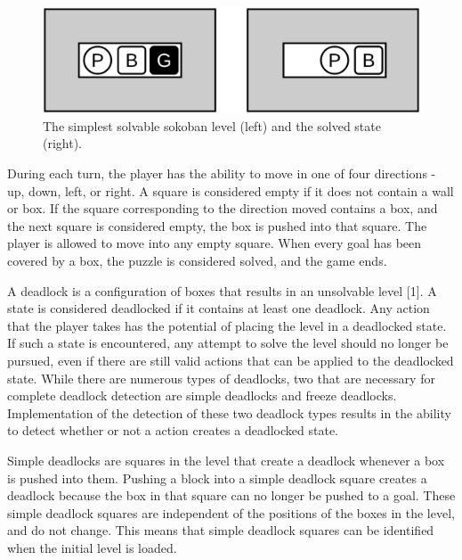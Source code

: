 \documentclass[times, 10pt,twocolumn]{article}
\begin{document}
\begin{figure}[h] 
  \centering
     \includegraphics[width=0.7\linewidth]{basic_unsolved_solved.png}
  \caption{The simplest solvable sokoban level (left) and the solved state (right).}
  \label{fig:b}
\end{figure}


During each turn, the player has the ability to move in one of four directions - up, down, left, or right. A square is considered empty if it does not contain a wall or box. If the square corresponding to the direction moved contains a box, and the next square is considered empty, the box is pushed into that square. The player is allowed to move into any empty square. When every goal has been covered by a box, the puzzle is considered solved, and the game ends.


A deadlock is a configuration of boxes that results in an unsolvable level [1]. A state is considered deadlocked if it contains at least one deadlock. Any action that the player takes has the potential of placing the level in a deadlocked state. If such a state is encountered, any attempt to solve the level should no longer be pursued, even if there are still valid actions that can be applied to the deadlocked state. While there are numerous types of deadlocks, two that are necessary for complete deadlock detection are simple deadlocks and freeze deadlocks. Implementation of the detection of these two deadlock types results in the ability to detect whether or not a action creates a deadlocked state. 


Simple deadlocks are squares in the level that create a deadlock whenever a box is pushed into them. Pushing a block into a simple deadlock square creates a deadlock because the box in that square can no longer be pushed to a goal. These simple deadlock squares are independent of the positions of the boxes in the level, and do not change. This means that simple deadlock squares can be identified when the initial level is loaded. 
\end{document}
